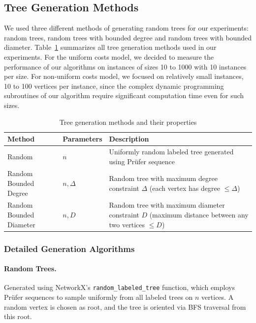 \subsection*{Tree Generation Methods}

We used three different methods of generating random trees for our experiments: random trees, random trees with bounded degree and random trees with bounded diameter. 
Table~\ref{tab:tree_methods} summarizes all tree generation methods used in our experiments. For the uniform costs model, we decided to measure the performance of our algorithms on instances of sizes 10 to 1000 with 10 instances per size. For non-uniform costs model, we focused on relatively small instances, 10 to 100 vertices per instance, since the complex dynamic programming subroutines of our algorithm require significant computation time even for such sizes.

\begin{table}[!h]
\centering
\caption{Tree generation methods and their properties}
\label{tab:tree_methods}
\small
\begin{tabular}{|l|l|p{8cm}|}
\hline
\textbf{Method} & \textbf{Parameters} & \textbf{Description} \\
\hline
Random & $n$ & Uniformly random labeled tree generated using Prüfer sequence \\
\hline
Random Bounded Degree & $n, \Delta$ & Random tree with maximum degree constraint $\Delta$ (each vertex has degree $\leq \Delta$) \\
\hline
Random Bounded Diameter & $n, D$ & Random tree with maximum diameter constraint $D$ (maximum distance between any two vertices $\leq D$) \\
\hline
\end{tabular}
\end{table}

\subsubsection*{Detailed Generation Algorithms}

\paragraph{Random Trees.} Generated using NetworkX's \texttt{random\_labeled\_tree} function, which employs Prüfer sequences to sample uniformly from all labeled trees on $n$ vertices. A random vertex is chosen as root, and the tree is oriented via BFS traversal from this root.

